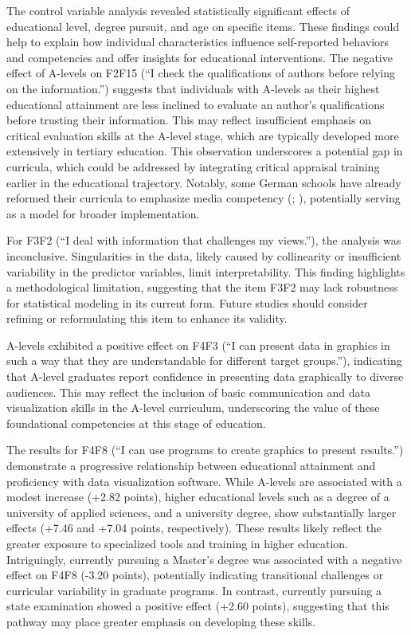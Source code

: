 \documentclass[
  12pt,
  a4paper,
  twoside]{article}
\begin{document}
The control variable analysis revealed statistically significant effects of educational level, degree pursuit, and age on specific items. These findings could help to explain how individual characteristics influence self-reported behaviors and competencies and offer insights for educational interventions.
The negative effect of A-levels on F2F15 (``I check the qualifications of authors before relying on the information.'') suggests that individuals with A-levels as their highest educational attainment are less inclined to evaluate an author's qualifications before trusting their information. This may reflect insufficient emphasis on critical evaluation skills at the A-level stage, which are typically developed more extensively in tertiary education. This observation underscores a potential gap in curricula, which could be addressed by integrating critical appraisal training earlier in the educational trajectory. Notably, some German schools have already reformed their curricula to emphasize media competency (; ), potentially serving as a model for broader implementation.

For F3F2 (``I deal with information that challenges my views.''), the analysis was inconclusive. Singularities in the data, likely caused by collinearity or insufficient variability in the predictor variables, limit interpretability. This finding highlights a methodological limitation, suggesting that the item F3F2 may lack robustness for statistical modeling in its current form. Future studies should consider refining or reformulating this item to enhance its validity.

A-levels exhibited a positive effect on F4F3 (``I can present data in graphics in such a way that they are understandable for different target groups.''), indicating that A-level graduates report confidence in presenting data graphically to diverse audiences. This may reflect the inclusion of basic communication and data visualization skills in the A-level curriculum, underscoring the value of these foundational competencies at this stage of education.

The results for F4F8 (``I can use programs to create graphics to present results.'') demonstrate a progressive relationship between educational attainment and proficiency with data visualization software. While A-levels are associated with a modest increase (+2.82 points), higher educational levels such as a degree of a university of applied sciences, and a university degree, show substantially larger effects (+7.46 and +7.04 points, respectively). These results likely reflect the greater exposure to specialized tools and training in higher education. Intriguingly, currently pursuing a Master's degree was associated with a negative effect on F4F8 (-3.20 points), potentially indicating transitional challenges or curricular variability in graduate programs. In contrast, currently pursuing a state examination showed a positive effect (+2.60 points), suggesting that this pathway may place greater emphasis on developing these skills.
\end{document}
